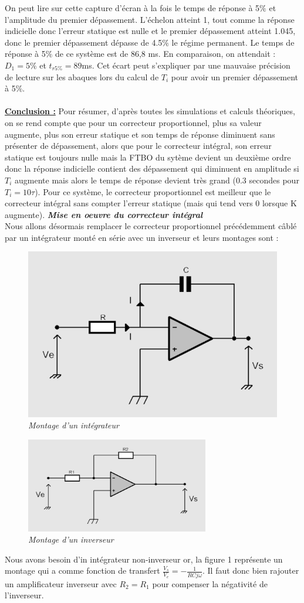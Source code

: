 \documentclass[12pt]{article}
\begin{document}
On peut lire sur cette capture d'écran à la fois le temps de réponse à 5$\%$ et l'amplitude du premier dépassement. L'échelon atteint 1, tout comme la réponse indicielle donc l'erreur statique est nulle et le premier dépassement atteint 1.045, donc le premier dépassement dépasse de 4.5$\%$ le régime permanent. Le temps de réponse à 5$\%$ de ce système est de 86,8 ms.
En comparaison, on attendait : $D_1 = 5\%$ et $t_{r5\%} = 89$ms. Cet écart peut s'expliquer par une mauvaise précision de lecture sur les abaques lors du calcul de $T_i$ pour avoir un premier dépassement à 5$\%$.
\\\\\underline{\bf Conclusion :} Pour résumer, d'après toutes les simulations et calculs théoriques, on se rend compte que pour un correcteur proportionnel, plus sa valeur augmente, plus son erreur statique et son temps de réponse diminuent sans présenter de dépassement, alors que pour le correcteur intégral, son erreur statique est toujours nulle mais la FTBO du sytème devient un deuxième ordre donc la réponse indicielle contient des dépassement qui diminuent en amplitude si $T_i$ augmente mais alors le temps de réponse devient très grand (0.3 secondes pour $T_i = 10\tau$). Pour ce système, le correcteur proportionnel est meilleur que le correcteur intégral sans compter l'erreur statique (mais qui tend vers 0 lorsque K augmente). 
\newpage \large \textit{\textbf{Mise en oeuvre du correcteur intégral}}
\\Nous allons désormais remplacer le correcteur proportionnel précédemment câblé par un intégrateur monté en série avec un inverseur et leurs montages sont :
\begin{figure}[!h]
    \centering
    \includegraphics[width = 8 cm]{TP3/integrateur.png}
    \caption{\itshape Montage d'un intégrateur}
\end{figure}
\begin{figure}[!h]
    \centering
    \includegraphics[width = 8cm]{TP3/inverseur.png}
    \caption{\itshape Montage d'un inverseur}
\end{figure}
Nous avons besoin d'in intégrateur non-inverseur or, la figure 1 représente un montage qui a comme fonction de transfert $\frac{V_s}{V_e} = -\frac{1}{RCj\omega}$. Il faut donc bien rajouter un amplificateur inverseur avec $R_2=R_1$ pour compenser la négativité de l'inverseur.
\end{document}
